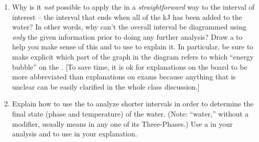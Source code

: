 \begin{enumerate}[1.]

	\item Why is it \emph{not} possible to apply the \textbf{\EnergyInteractionModel{}} in a {\em straightforward} way to the interval of interest -- the interval that ends when all of the \unit[252]{kJ} has been added to the water? In other words, why can't the overall interval be diagrammed using {\em only} the given information prior to doing any further analysis?   Draw a \TempGraph{} to help you make sense of this and to use to explain it. In particular, be sure to make explicit which part of the graph in the diagram refers to which ``energy bubble'' on the \EnergyDiagram{}. [To save time, it is ok for explanations on the board to be more abbreviated than explanations on exams because anything that is unclear can be easily clarified in the whole class discussion.]
	
	\item Explain how to use the \textbf{\EnergyInteractionModel{}} to analyze shorter intervals in order to determine the final state (phase and temperature) of the water.  (Note: ``water,'' without a modifier, usually means  in any one of its Three-Phases.) Use a \TempGraph{} in your analysis and to use in your explanation.

\WCD 

\end{enumerate}